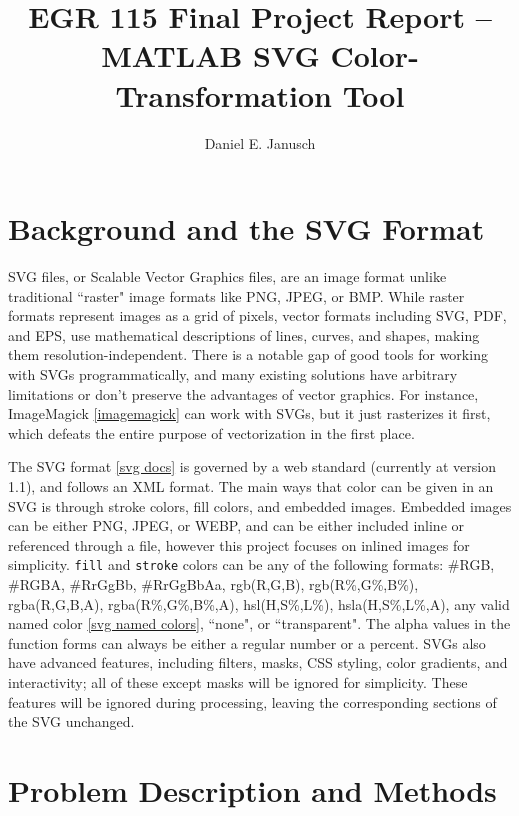 \documentclass[12pt]{article}
\begin{document}

\title{EGR 115 Final Project Report {\bf–} MATLAB SVG Color-Transformation Tool}
\author{Daniel E. Janusch}
\maketitle

\section{Background and the SVG Format}

\indent \indent \indent SVG files, or Scalable Vector Graphics files, are an image format unlike traditional ``raster" image formats like PNG, JPEG, or BMP. While raster formats represent images as a grid of pixels, vector formats including SVG, PDF, and EPS, use mathematical descriptions of lines, curves, and shapes, making them resolution-independent. There is a notable gap of good tools for working with SVGs programmatically, and many existing solutions have arbitrary limitations or don't preserve the advantages of vector graphics. For instance, ImageMagick \ref{imagemagick} can work with SVGs, but it just rasterizes it first, which defeats the entire purpose of vectorization in the first place.
\vspace{5px}

\indent \indent The SVG format \ref{svg docs} is governed by a web standard (currently at version 1.1), and follows an XML format. The main ways that color can be given in an SVG is through stroke colors, fill colors, and embedded images. Embedded images can be either PNG, JPEG, or WEBP, and can be either included inline or referenced through a file, however this project focuses on inlined images for simplicity. \texttt{fill} and \texttt{stroke} colors can be any of the following formats: \#RGB, \#RGBA, \#RrGgBb, \#RrGgBbAa, rgb(R,G,B), rgb(R\%,G\%,B\%), rgba(R,G,B,A), rgba(R\%,G\%,B\%,A), hsl(H,S\%,L\%), hsla(H,S\%,L\%,A), any valid named color \ref{svg named colors}, ``none", or ``transparent". The alpha values in the function forms can always be either a regular number or a percent. SVGs also have advanced features, including filters, masks, CSS styling, color gradients, and interactivity; all of these except masks will be ignored for simplicity. These features will be ignored during processing, leaving the corresponding sections of the SVG unchanged.


\section{Problem Description and Methods}
\end{document}
